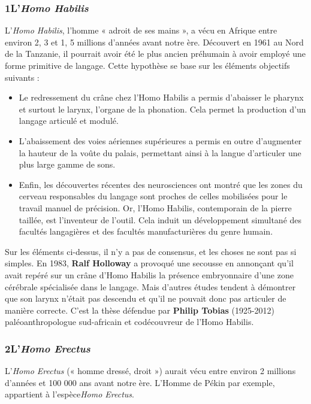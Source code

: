 \subsubsection*{1\quad L’\textit{Homo Habilis}}
L’\textit{Homo Habilis}, l’homme « adroit de ses mains », a vécu en Afrique entre environ 2, 3 et 1, 5 millions d’années avant notre ère. Découvert en 1961 au Nord de la Tanzanie, il pourrait avoir été le plus ancien préhumain à avoir employé une forme primitive de langage. Cette hypothèse se base sur les éléments objectifs suivants :
\begin{itemize}
\item Le redressement du crâne chez l’Homo Habilis a permis d’abaisser le pharynx et surtout le larynx, l’organe de la phonation. Cela permet la production d’un langage articulé et modulé.
\item L’abaissement des voies aériennes supérieures a permis en outre d’augmenter la hauteur de la voûte du palais, permettant ainsi à la langue d’articuler une plus large gamme de sons.
\item Enfin, les découvertes récentes des neurosciences ont montré que les zones du cerveau responsables du langage sont proches de celles mobilisées pour le travail manuel de précision. Or, l’Homo Habilis, contemporain de la pierre taillée, est l’inventeur de l’outil. Cela induit un développement simultané des facultés langagières et des facultés manufacturières du genre humain.
\end{itemize}
Sur les éléments ci-dessus, il n’y a pas de consensus, et les choses ne sont pas si simples. En 1983, \textbf{Ralf Holloway} a provoqué une secousse en annonçant qu’il avait repéré sur un crâne d’Homo Habilis la présence embryonnaire d’une zone cérébrale spécialisée dans le langage.
Mais d’autres études tendent à démontrer que son larynx n’était pas descendu et qu’il ne pouvait donc pas articuler de manière correcte. C’est la thèse défendue par \textbf{Philip Tobias} (1925-2012) paléoanthropologue sud-africain et codécouvreur de l’Homo Habilis.
\subsubsection*{2\quad L’\textit{Homo Erectus}}
L’\textit{Homo Erectus} (« homme dressé, droit ») aurait vécu entre environ 2 millions d’années et 100 000 ans avant notre ère. L’Homme de Pékin par exemple, appartient à l’espèce\textit{Homo Erectus}.

